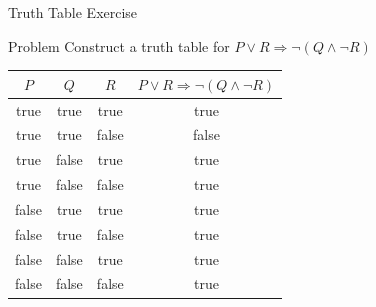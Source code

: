 \documentclass[14pt]{beamer}
\newcommand{\limpl}{\Rightarrow}
\begin{document}
\begin{frame}{Truth Table Exercise}
	\begin{block}{Problem}
		Construct a truth table for $P \lor R \limpl \lnot (Q \land \lnot R)$
	\end{block}
	\pause
	\medskip
	\em
	\begin{tabular}{|ccc||c|}
		\hline
		$P$   & $Q$   & $R$          & $P \lor R \limpl \lnot (Q \land \lnot R)$ \\
		\hline
		true  & true  & true  \pause & true  \pause\\
		true  & true  & false \pause & false \pause\\
		true  & false & true  \pause & true  \pause\\
		true  & false & false \pause & true  \pause\\
		false & true  & true  \pause & true  \pause\\
		false & true  & false \pause & true  \pause\\
		false & false & true  \pause & true  \pause\\
		false & false & false \pause & true \\
		\hline
	\end{tabular}
\end{frame}
\end{document}
